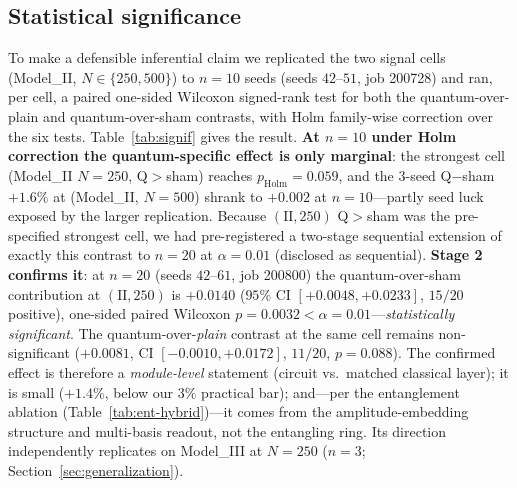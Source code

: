 \documentclass[10pt,letterpaper]{article}
\theoremstyle{plain}
\theoremstyle{definition}
\begin{document}
\subsection{Statistical significance}
\label{sec:significance}

To make a defensible inferential claim we replicated the two signal cells
(Model\_II, $N\in\{250,500\}$) to $n{=}10$ seeds (seeds $42$--$51$, job 200728)
and ran, per cell, a paired one-sided Wilcoxon signed-rank test for both the
quantum-over-plain and quantum-over-sham contrasts, with Holm family-wise
correction over the six tests. Table~\ref{tab:signif} gives the result.
\textbf{At $n{=}10$ under Holm correction the quantum-specific effect is only
marginal}: the strongest cell (Model\_II $N{=}250$, Q$>$sham) reaches
$p_{\mathrm{Holm}}{=}0.059$, and the $3$-seed Q$-$sham $+1.6\%$ at
(Model\_II, $N{=}500$) shrank to $+0.002$ at $n{=}10$---partly seed luck exposed
by the larger replication. Because $(\text{II},250)$ Q$>$sham was the pre-specified strongest
cell, we had pre-registered a two-stage sequential extension of exactly this
contrast to $n{=}20$ at $\alpha{=}0.01$ (disclosed as sequential).
\textbf{Stage 2 confirms it}: at $n{=}20$ (seeds $42$--$61$, job 200800) the
quantum-over-sham contribution at $(\text{II},250)$ is $+0.0140$ ($95\%$ CI
$[+0.0048,+0.0233]$, $15/20$ positive), one-sided paired Wilcoxon
$p{=}0.0032 < \alpha{=}0.01$---\emph{statistically significant}. The
quantum-over-\emph{plain} contrast at the same cell remains non-significant
($+0.0081$, CI $[-0.0010,+0.0172]$, $11/20$, $p{=}0.088$). The confirmed effect is
therefore a \emph{module-level} statement (circuit vs.\ matched classical layer);
it is small ($+1.4\%$, below our $3\%$ practical bar); and---per the entanglement
ablation (Table~\ref{tab:ent-hybrid})---it comes from the amplitude-embedding
structure and multi-basis readout, not the entangling ring. Its direction
independently replicates on Model\_III at $N{=}250$ ($n{=}3$;
Section~\ref{sec:generalization}).
\end{document}
